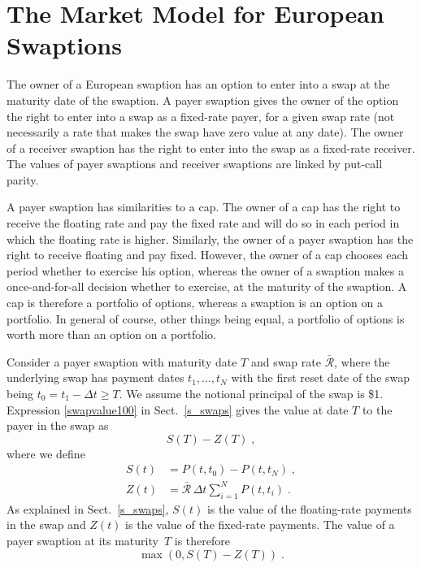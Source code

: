 \section{The Market Model for European Swaptions}\label{s_swaptions}

The owner of a European swaption  has an option to enter into a swap at the maturity date of the swaption.  A payer swaption  gives the owner of the option the right to enter into a swap as a fixed-rate payer, for a given swap rate (not necessarily a rate that makes the swap have zero value at any date).  The owner of a receiver swaption  has the right to enter into the swap as a fixed-rate receiver.  The values of payer swaptions and receiver swaptions are linked by put-call parity.  

A payer swaption has similarities to a cap.  The owner of a cap has the right to receive the floating rate and pay the fixed rate and will do so in each period in which the floating rate is higher.  Similarly, the owner of a payer swaption has the right to receive floating and pay fixed.  However, the owner of a cap chooses each period whether to exercise his option, whereas the owner of a swaption makes a once-and-for-all decision whether to exercise, at the maturity of the swaption.  A cap is therefore a portfolio of options, whereas a swaption is an option on a portfolio.  In general of course, other things being equal, a portfolio of options is worth more than an option on a portfolio. 

Consider a payer swaption with maturity date $T$ and swap rate $\bar{\mathcal{R}}$, where the underlying swap has payment dates $t_1,\ldots,t_N$ with the first reset date of the swap being $t_0 = t_1-\varDelta t \geq T$.  We assume the notional principal of the swap is \$1.  Expression \eqref{swapvalue100} in Sect.~\ref{s_swaps} gives the value at date $T$ to the payer in the swap as
$$S(T)-Z(T)\; ,$$
where we define
\begin{align}
S(t)&=P(t,t_0)- P(t,t_N)\; ,\\
Z(t) &=  \bar{\mathcal{R}}\,\varDelta t \sum_{i=1}^N P(t,t_i)\;.\label{fixedrateside}
\end{align}
As explained in Sect.~\ref{s_swaps}, $S(t)$ is the value of the floating-rate payments in the swap and $Z(t)$ is the value of the fixed-rate payments.  The value of a payer swaption at its maturity~$T$ is therefore
$$\max(0,S(T)-Z(T))\; .$$

